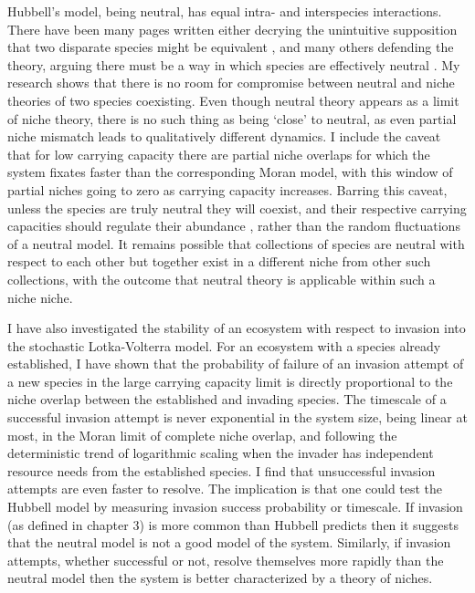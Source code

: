 Hubbell's model, being neutral, has equal intra- and interspecies interactions. 
There have been many pages written either decrying the unintuitive supposition that two disparate species might be equivalent \cite{Ricklefs2006,Kalyuzhny2014,Carroll2015}, and many others defending the theory, arguing there must be a way in which species are effectively neutral \cite{Hubbell2006,Rosindell2011}. %
My research shows that there is no room for compromise between neutral and niche theories of two species coexisting. 
Even though neutral theory appears as a limit of niche theory, there is no such thing as being `close' to neutral, as even partial niche mismatch leads to qualitatively different dynamics. 
I include the caveat that for low carrying capacity there are partial niche overlaps for which the system fixates faster than the corresponding Moran model, with this window of partial niches going to zero as carrying capacity increases. %
Barring this caveat, unless the species are truly neutral they will coexist, and their respective carrying capacities should regulate their abundance \cite{MacArthur1957,Sugihara2003,Leibold1995}, rather than the random fluctuations of a neutral model. 
It remains possible that collections of species are neutral with respect to each other but together exist in a different niche from other such collections, with the outcome that neutral theory is applicable within such a niche niche. 

I have also investigated the stability of an ecosystem with respect to invasion into the stochastic Lotka-Volterra model. 
For an ecosystem with a species already established, I have shown that the probability of failure of an invasion attempt of a new species in the large carrying capacity limit is directly proportional to the niche overlap between the established and invading species. 
The timescale of a successful invasion attempt is never exponential in the system size, being linear at most, in the Moran limit of complete niche overlap, and following the deterministic trend of logarithmic scaling when the invader has independent resource needs from the established species. 
I find that unsuccessful invasion attempts are even faster to resolve. 
The implication is that one could test the Hubbell model by measuring invasion success probability or timescale. 
If invasion (as defined in chapter 3) is more common than Hubbell predicts then it suggests that the neutral model is not a good model of the system. %
Similarly, if invasion attempts, whether successful or not, resolve themselves more rapidly than the neutral model then the system is better characterized by a theory of niches. 

